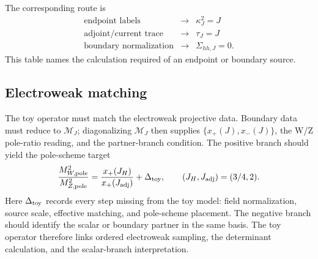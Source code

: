 The corresponding route is
\begin{equation}
\begin{array}{ccc}
\text{endpoint labels} & \longrightarrow & \kappa_J^2=J\\
\text{adjoint/current trace} & \longrightarrow & \tau_J=J\\
\text{boundary normalization} & \longrightarrow & \Sigma_{hh,J}=0 .
\end{array}
\label{eq:endpoint-route-table}
\end{equation}
This table names the calculation required of an endpoint or boundary source.

\subsection{Electroweak matching}

The toy operator must match the electroweak projective data.  Boundary data
must reduce to \(\mathcal M_J\); diagonalizing \(\mathcal M_J\) then supplies
\(\{x_+(J),x_-(J)\}\), the W/Z pole-ratio reading, and the partner-branch
condition.
The positive branch should yield the pole-scheme target
\begin{equation}
  \frac{M_{W,\rm pole}^2}{M_{Z,\rm pole}^2}=
  \frac{x_+(J_H)}{x_+(J_{\rm adj})}
  +\Delta_{\rm toy},
  \qquad
  (J_H,J_{\rm adj})=(3/4,2).
  \label{eq:toy-ew-match}
\end{equation}
Here \(\Delta_{\rm toy}\) records every step missing from the toy model:
field normalization, source scale, effective matching, and pole-scheme
placement.
The negative branch should identify the scalar or boundary partner in the same
basis.  The toy operator therefore links ordered electroweak sampling, the
determinant calculation, and the scalar-branch interpretation.
